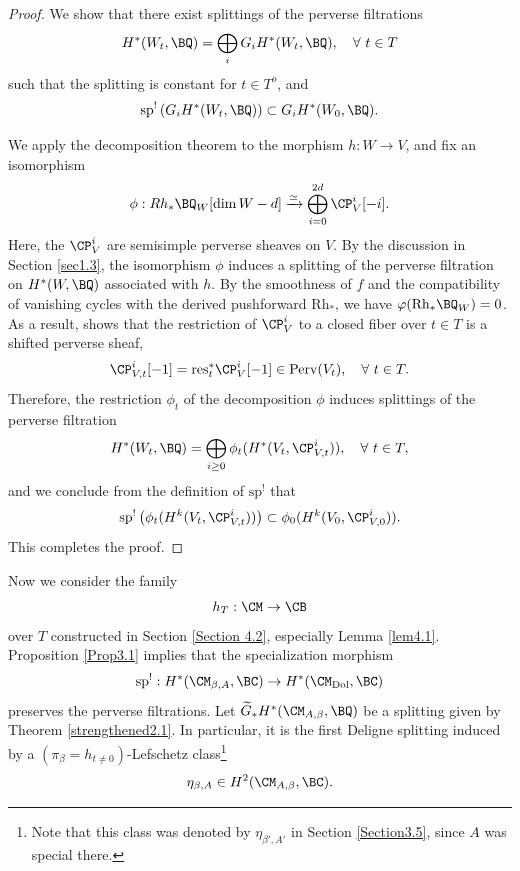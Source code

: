 \begin{proof}
We show that there exist splittings of the perverse filtrations
\[
H^*(W_t, \BQ) = \bigoplus_{i}G_iH^*(W_t, \BQ), \quad \forall~ t \in T
\]
such that the splitting is constant for $t \in T^o$, and
\begin{equation*}
\mathrm{sp}^!\left(G_iH^*(W_t ,\BQ)\right) \subset G_iH^*(W_0, \BQ).
\end{equation*}




We apply the decomposition theorem \cite{BBD} to the morphism $h: W \to V$, and fix an isomorphism
\[
\phi: Rh_\ast \BQ_W [\dim{W} - d] \xrightarrow{\simeq} \bigoplus_{i=0}^{2d} \CP_V^i [-i].
\]
Here, the $\CP_V^i$ are semisimple perverse sheaves on $V$. By the discussion in Section \ref{sec1.3}, the isomorphism $\phi$ induces a splitting of the perverse filtration on $H^*(W, \BQ)$ associated with $h$. By the smoothness of $f$ and the compatibility of vanishing cycles with the derived pushforward $\mathrm{Rh}_*$, we have $\varphi(\mathrm{Rh}_\ast \BQ_W) = 0$.  As a result, \cite[Corollary 3.1.6]{dCM} shows that the restriction of $\CP_V^i$ to a closed fiber over $t\in T$ is a shifted perverse sheaf,
\[
\CP_{V,t}^i [-1] = \mathrm{res}_t^*\CP_V^i [-1] \in \mathrm{Perv}(V_t), \quad \forall~ t\in T.
\]
Therefore, the restriction $\phi_t$ of the decomposition $\phi$ induces  splittings of the perverse filtration
\[
H^*(W_t, \BQ) = \bigoplus_{i \geq 0} \phi_t (H^*(V_t, \CP_{V,t}^i)), \quad \forall~ t\in T,
\]
and we conclude from the definition of $\mathrm{sp}^!$ that
\[
\mathrm{sp}^! \left(\phi_t(H^k(V_t, \CP_{V,t}^i))\right) \subset \phi_0(H^k(V_0, \CP_{V,0}^i)).
\]
This completes the proof.
\end{proof}

Now we consider the family
\[
h_T: \CM \to  \CB
\]
over $T$ constructed in Section \ref{Section 4.2}, especially Lemma \ref{lem4.1}. Proposition \ref{Prop3.1} implies that the specialization morphism
\[
\mathrm{sp}^!: H^*(\CM_{\beta, A}, \BC) \to H^*(\CM_{\mathrm{Dol}}, \BC)
\]
preserves the perverse filtrations. Let $\widetilde{G}_*H^*(\CM_{A,\beta}, \BQ)$ be a splitting given by Theorem \ref{strengthened2.1}. In particular,  it is the first Deligne splitting induced by a  { $(\pi_\beta=h_{t\neq 0})$-}Lefschetz class\footnote{Note that this class was denoted by $\eta_{\beta',A'}$ in Section \ref{Section3.5}, since $A$ was special there.}
\[
\eta_{\beta,A} \in H^2(\CM_{A,\beta}, \BC).
\]



